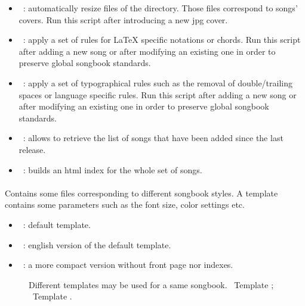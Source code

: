 \begin{itemize}
\item {}~: automatically resize  files of
  the  directory. Those files correspond to
  songs' covers. Run this script after introducing a new jpg cover.

\item {}~: apply a set of rules for \LaTeX{} specific
  notations or chords. Run this script after adding a new song or
  after modifying an existing one in order to preserve global songbook
  standards.

\item {}~: apply a set of typographical rules such as the
  removal of double/trailing spaces or language specific rules. Run
  this script after adding a new song or after modifying an existing
  one in order to preserve global songbook standards.

\item {}~: allows to retrieve the list of songs
  that have been added since the last release.

\item {}~: builds an html index for the whole set of
  songs.
\end{itemize}

\paragraph{}
Contains some files corresponding to different songbook styles.  A
template contains some parameters such as the font size, color
settings etc.

\begin{itemize}
\item {}~: default template.
\item {}~: english version of the default
  template.
\item {}~: a more compact version without front page
  nor indexes.
\end{itemize}

\begin{figure}
  \centering
  \hspace{0.1cm}%
  \caption[Templates]{%
    Different templates may be used for a same songbook.
    ~Template ; %
    ~Template .%
  }%
  \label{fig:templates}
\end{figure}


